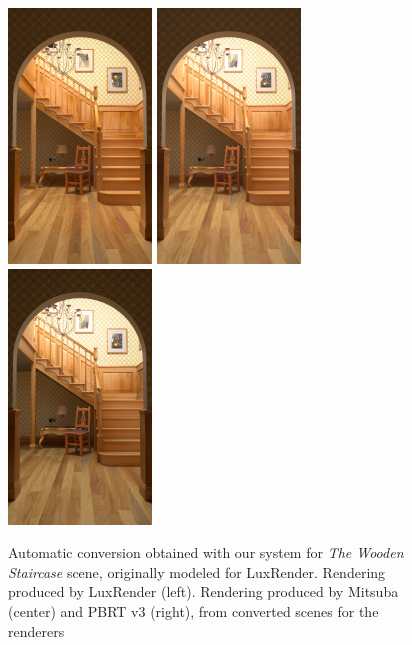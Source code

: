 \begin{figure}
\centering
\includegraphics[width=1.5in]{figs/4_results/staircase/1_from_lux.png}
\includegraphics[width=1.5in]{figs/4_results/staircase/2_to_mitsuba.png}
\includegraphics[width=1.5in]{figs/4_results/staircase/3_to_pbrt.png}
\caption{Automatic conversion obtained with our system for \textit{The Wooden Staircase}
scene, originally modeled for LuxRender. Rendering produced by LuxRender (left).
Rendering produced by Mitsuba (center) and PBRT v3 (right),
from converted scenes for the renderers}
\label{fig:staircase}
\end{figure}

